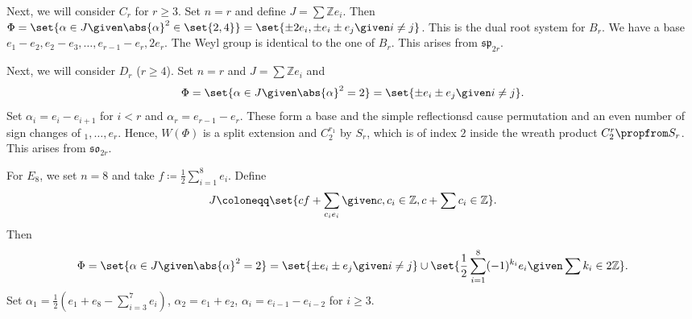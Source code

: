 Next, we will consider $C_r$ for $r\geq 3$. Set $n = r$ and define
$J = \sum \mathbb{Z}e_i$. Then
$\Phi = \set{\alpha \in J\given \abs{\alpha}^2 \in \set{2, 4}} = \set{\pm 2e_i, \pm e_i\pm e_j\given i\neq j}$.
This is the dual root system for $B_r$. We have a base $e_1 - e_2, e_2 - e_3, \ldots, e_{r-1} - e_r, 2e_r$.
The Weyl group is identical to the one of $B_r$. This arises from $\mathfrak{sp}_{2r}$.

Next, we will consider $D_r$ ($r\geq 4$). Set $n = r$ and $J = \sum \mathbb{Z}e_i$
and
\[ \Phi = \set{\alpha \in J\given \abs{\alpha}^2 = 2} = \set{\pm e_i\pm e_j\given i\neq j}. \]
Set $\alpha_i = e_i - e_{i+1}$ for $i < r $ and $\alpha_r = e_{r-1} - e_r$. These
form a base and the simple reflectionsd cause permutation and an even number of
sign changes of $_1, \ldots, e_r$. Hence, $W(\Phi)$ is a split extension and
$C_2^{r_1}$ by $S_r$, which is of index $2$ inside the wreath product
$C_2^r\propfrom S_r$. This arises from $\mathfrak{so}_{2r}$.

For $E_8$, we set $n = 8$ and take $f\coloneqq \frac{1}{2}\sum_{i=1}^8 e_i$.
Define
\[ J\coloneqq \set{cf + \sum_{c_ie_i}\given c, c_i \in\mathbb{Z}, c + \sum c_i \in\mathbb{Z}}. \]
Then
\[ \Phi = \set{\alpha \in J\given \abs{\alpha}^2 = 2} = \set{\pm e_i\pm e_j\given i\neq j}\cup\set{\frac{1}{2}\sum_{i=1}^8(-1)^{k_i}e_i\given \sum k_i \in 2\mathbb{Z}}. \]
Set $\alpha_1 = \frac{1}{2}(e_1 + e_8 - \sum_{i=3}^7 e_i)$,
$\alpha_2 = e_1 + e_2$, $\alpha_i = e_{i-1}- e_{i-2}$ for $i\geq 3$.
